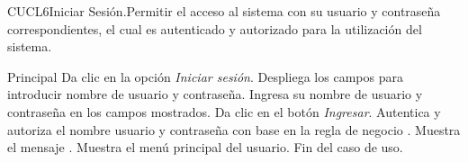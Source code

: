 
\begin{UseCase}{CUCL6}{Iniciar Sesión.}{Permitir el acceso al sistema con su usuario y contraseña correspondientes, el cual es autenticado y autorizado para la utilización del sistema.
	}
\end{UseCase}


\begin{UCtrayectoria}{Principal}
	\UCpaso[\UCactor] Da clic en la opción \textit{Iniciar sesión}.
	\UCpaso Despliega los campos para introducir nombre de usuario y contraseña.
	\UCpaso[\UCactor] Ingresa su nombre de usuario y contraseña en los campos mostrados. \label{CUCL6Regresa}  
	\UCpaso[\UCactor] Da clic en el botón \textit{Ingresar}.
	\UCpaso Autentica y autoriza el nombre usuario y contraseña con base en la regla de negocio .          
	\UCpaso Muestra el mensaje . 
	\UCpaso Muestra el menú principal del usuario.
	\UCpaso Fin del caso de uso.
\end{UCtrayectoria}

